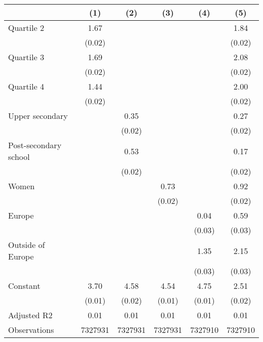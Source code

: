 
\begin{tabular}{@{}l*{5}{S[table-format={-}2.2{\tnote{***}}]}@{}}
\toprule
{} & {(1)} & {(2)} & {(3)} & {(4)} & {(5)}\tabularnewline%
\midrule
Quartile 2 & 1.67\tnote{***} &  &  &  & 1.84\tnote{***}\tabularnewline%
 & (0.02) &  &  &  & \vphantom{2} (0.02)\tabularnewline%
Quartile 3 & 1.69\tnote{***} &  &  &  & 2.08\tnote{***}\tabularnewline%
 & (0.02) &  &  &  & \vphantom{1} (0.02)\tabularnewline%
Quartile 4 & 1.44\tnote{***} &  &  &  & 2.00\tnote{***}\tabularnewline%
 & (0.02) &  &  &  & (0.02)\tabularnewline%
Upper secondary &  & 0.35\tnote{***} &  &  & 0.27\tnote{***}\tabularnewline%
 &  & (0.02) &  &  & \vphantom{1} (0.02)\tabularnewline%
Post-secondary school &  & 0.53\tnote{***} &  &  & 0.17\tnote{***}\tabularnewline%
 &  & (0.02) &  &  & (0.02)\tabularnewline%
Women &  &  & 0.73\tnote{***} &  & 0.92\tnote{***}\tabularnewline%
 &  &  & (0.02) &  & (0.02)\tabularnewline%
Europe &  &  &  & 0.04\tnote{\dagger} & 0.59\tnote{***}\tabularnewline%
 &  &  &  & (0.03) & \vphantom{1} (0.03)\tabularnewline%
Outside of Europe &  &  &  & 1.35\tnote{***} & 2.15\tnote{***}\tabularnewline%
 &  &  &  & (0.03) & (0.03)\tabularnewline%
Constant & 3.70\tnote{***} & 4.58\tnote{***} & 4.54\tnote{***} & 4.75\tnote{***} & 2.51\tnote{***}\tabularnewline%
 & (0.01) & (0.02) & (0.01) & (0.01) & (0.02)\tabularnewline%
\midrule
Adjusted R2 & 0.01 & 0.01 & 0.01 & 0.01 & 0.01\tabularnewline%
Observations & {\num{7327931}} & {\num{7327931}} & {\num{7327931}} & {\num{7327910}} & {\num{7327910}}\tabularnewline%
\bottomrule
\end{tabular}
